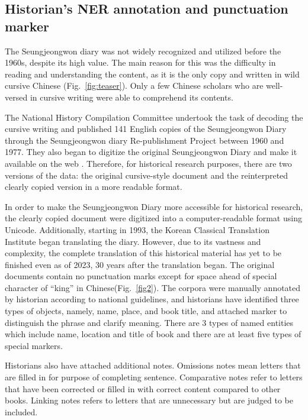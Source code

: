 \documentclass[sigconf]{acmart}
\begin{document}
\subsection{Historian’s NER annotation and punctuation marker }

The Seungjeongwon diary was not widely recognized and utilized before the 1960s, despite its high value. The main reason for this was the difficulty in reading and understanding the content, as it is the only copy and written in wild cursive Chinese (Fig.~\ref{fig:teaser}). Only a few Chinese scholars who are well-versed in cursive writing were able to comprehend its contents\cite{ref_article6}.

The National History Compilation Committee undertook the task of decoding the cursive writing and published 141 English copies of the Seungjeongwon Diary through the Seungjeongwon diary Re-publishment Project between 1960 and 1977. They also began to digitize the original Seungjeongwon Diary and make it available on the web . Therefore, for historical research purposes, there are two versions of the data: the original cursive-style document and the reinterpreted clearly copied version in a more readable format\cite{ref_article6}.

In order to make the Seungjeongwon Diary more accessible for historical research, the clearly copied document were digitized into a computer-readable format using Unicode. Additionally, starting in 1993, the Korean Classical Translation Institute began translating the diary. However, due to its vastness and complexity, the complete translation of this historical material has yet to be finished even as of 2023, 30 years after the translation began\cite{ref_article6}. The original documents contain no punctuation marks except for space ahead of special character of “king” in Chinese(Fig.~\ref{fig2}). The corpora were manually annotated by historian according to national guidelines, and historians have identified three types of objects, namely, name, place, and book title, and attached marker to distinguish the phrase and clarify meaning. There are 3 types of named entities which include name, location and title of book and there are at least five types of special markers.

Historians also have attached additional notes. Omissions notes mean letters that are filled in for purpose of completing sentence. Comparative notes refer to letters that have been corrected or filled in with correct content compared to other books. Linking notes refers to letters that are unnecessary but are judged to be included.
\end{document}
